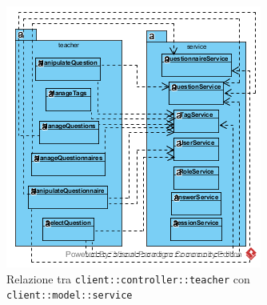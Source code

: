 \begin{center}
	\begin{figure}[H]
		\centering \includegraphics[scale=4, max width=\textwidth, max height=\myheight]{../img/diagrammiClassi/client/controller/controllerTeacher_modelService.png}
		\caption{Relazione tra \texttt{client::controller::teacher} con \texttt{client::model::service}}
	\end{figure}
\end{center}

